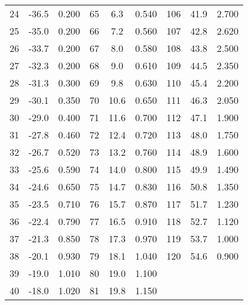 \begin{table}
\begin{tabular}{c c c@{\hskip 1cm}||@{\hskip 1cm} c c c@{\hskip 1cm} ||@{\hskip 1cm} c c c}
24  &    -36.5    &       0.200   & 65  &    6.3      &       0.540   &  106 &    41.9     &       2.700   \\                                    
25  &    -35.0    &       0.200   & 66  &    7.2      &       0.560   &  107 &    42.8     &       2.620  \\                                    
26  &    -33.7    &       0.200   & 67  &    8.0      &       0.580   &  108 &    43.8     &       2.500   \\   
27  &    -32.3    &       0.200   & 68  &    9.0      &       0.610   &  109 &    44.5     &       2.350  \\                                    
28  &    -31.3    &       0.300   & 69  &    9.8      &       0.630   &  110 &    45.4     &       2.200   \\                                    
29  &    -30.1    &       0.350   & 70  &    10.6     &       0.650   &  111 &    46.3     &       2.050  \\                                     
30  &    -29.0    &       0.400   & 71  &    11.6     &       0.700    &  112 &    47.1     &       1.900  \\                                    
31  &    -27.8    &       0.460   & 72  &    12.4     &       0.720   &  113 &    48.0       &       1.750  \\                                     
32  &    -26.7    &       0.520   & 73  &    13.2     &       0.760   &  114 &    48.9     &       1.600   \\                                     
33  &    -25.6    &       0.590   & 74  &    14.0     &       0.800    &  115 &    49.9     &       1.490  \\                                     
34  &    -24.6    &       0.650   & 75  &    14.7     &       0.830   &  116 &    50.8     &       1.350  \\                                     
35  &    -23.5    &       0.710   & 76  &    15.7     &       0.870   &  117 &    51.7     &       1.230  \\                                     
36  &    -22.4    &       0.790   & 77  &    16.5     &       0.910   &  118 &    52.7     &       1.120  \\                                     
37  &    -21.3    &       0.850   & 78  &    17.3     &       0.970   &  119 &    53.7     &       1.000  \\                                     
38  &    -20.1    &       0.930   & 79  &    18.1     &       1.040   &  120 &    54.6     &       0.900  \\                                     
39  &    -19.0      &     1.010   & 80  &    19.0     &       1.100    &      &             &             \\                 
40  &    -18.0      &     1.020   & 81  &    19.8     &       1.150   &      &             &             \\                    

    \end{tabular}
\end{table}




